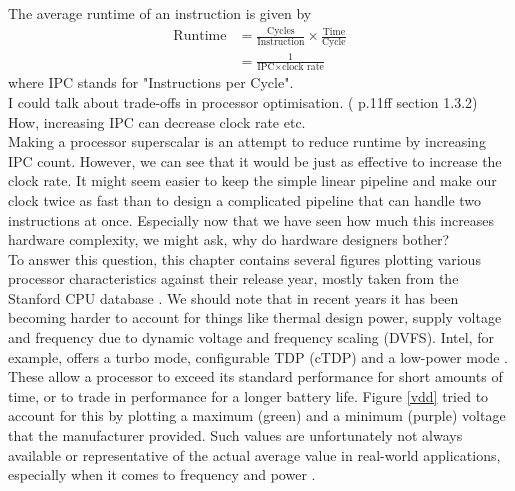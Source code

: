 \documentclass[12pt,a4paper]{article}
\newcommand{\note}{\textcolor{WildStrawberry}}
\begin{document}
The average runtime of an instruction is given by
\begin{equation}
\begin{aligned}
\text{Runtime} 
&= \frac{\text{Cycles}}{\text{Instruction}} \times \frac{\text{Time}}{\text{Cycle}}\\
&= \frac{1}{\text{IPC} \times \text{clock rate}} 
\end{aligned}
\end{equation}
where IPC stands for "Instructions per Cycle".\\
\note{I could talk about trade-offs in processor optimisation. (\cite{lipastiShen} p.11ff section 1.3.2) How, increasing IPC can decrease clock rate etc.}\\
Making a processor superscalar is an attempt to reduce runtime by increasing IPC count. However, we can see that it would be just as effective to increase the clock rate. It might seem easier to keep the simple linear pipeline and make our clock twice as fast than to design a complicated pipeline that can handle two instructions at once. Especially now that we have seen how much this increases hardware complexity, we might ask, why do hardware designers bother?\\

To answer this question, this chapter contains several figures plotting various processor characteristics against their release year, mostly taken from the Stanford CPU database \cite{cpudb}. We should note that in recent years it has been becoming harder to account for things like thermal design power, supply voltage and frequency due to dynamic voltage and frequency scaling (DVFS). Intel, for example, offers a turbo mode, configurable TDP (cTDP) and a low-power mode \cite[p.~87-94]{intelDataSheet}. These allow a processor to exceed its standard performance for short amounts of time, or to trade in performance for a longer battery life. Figure \ref{vdd} tried to account for this by plotting a maximum (green) and a minimum (purple) voltage that the manufacturer provided. Such values are unfortunately not always available or representative of the actual average value in real-world applications, especially when it comes to frequency and power \cite{caseAgainstACP}.
\end{document}
